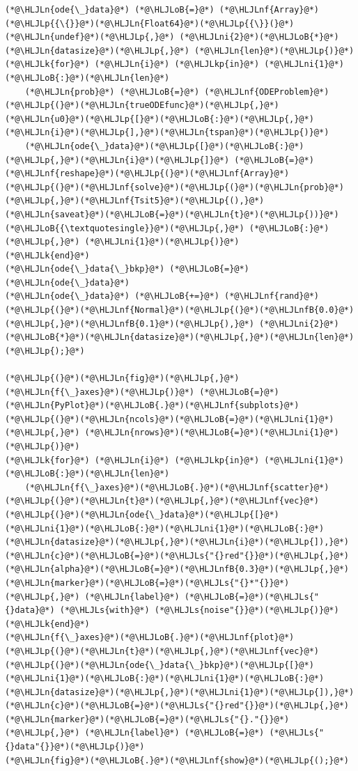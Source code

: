 \documentclass[12pt,a4paper]{article}
\newcommand{\HLJLk}[1]{\textcolor[RGB]{148,91,176}{\textbf{#1}}}
\newcommand{\HLJLkp}[1]{\textcolor[RGB]{148,91,176}{\textbf{#1}}}
\newcommand{\HLJLn}[1]{#1}
\newcommand{\HLJLnf}[1]{\textcolor[RGB]{66,102,213}{#1}}
\newcommand{\HLJLs}[1]{\textcolor[RGB]{201,61,57}{#1}}
\newcommand{\HLJLnfB}[1]{\textcolor[RGB]{59,151,46}{#1}}
\newcommand{\HLJLni}[1]{\textcolor[RGB]{59,151,46}{#1}}
\newcommand{\HLJLoB}[1]{\textcolor[RGB]{102,102,102}{\textbf{#1}}}
\newcommand{\HLJLp}[1]{#1}
\begin{document}
\begin{lstlisting}
(*@\HLJLn{ode{\_}data}@*) (*@\HLJLoB{=}@*) (*@\HLJLnf{Array}@*)(*@\HLJLp{{\{}}@*)(*@\HLJLn{Float64}@*)(*@\HLJLp{{\}}(}@*)(*@\HLJLn{undef}@*)(*@\HLJLp{,}@*) (*@\HLJLni{2}@*)(*@\HLJLoB{*}@*)(*@\HLJLn{datasize}@*)(*@\HLJLp{,}@*) (*@\HLJLn{len}@*)(*@\HLJLp{)}@*)
(*@\HLJLk{for}@*) (*@\HLJLn{i}@*) (*@\HLJLkp{in}@*) (*@\HLJLni{1}@*)(*@\HLJLoB{:}@*)(*@\HLJLn{len}@*)
	(*@\HLJLn{prob}@*) (*@\HLJLoB{=}@*) (*@\HLJLnf{ODEProblem}@*)(*@\HLJLp{(}@*)(*@\HLJLn{trueODEfunc}@*)(*@\HLJLp{,}@*)(*@\HLJLn{u0}@*)(*@\HLJLp{[}@*)(*@\HLJLoB{:}@*)(*@\HLJLp{,}@*)(*@\HLJLn{i}@*)(*@\HLJLp{],}@*)(*@\HLJLn{tspan}@*)(*@\HLJLp{)}@*)
	(*@\HLJLn{ode{\_}data}@*)(*@\HLJLp{[}@*)(*@\HLJLoB{:}@*)(*@\HLJLp{,}@*)(*@\HLJLn{i}@*)(*@\HLJLp{]}@*) (*@\HLJLoB{=}@*) (*@\HLJLnf{reshape}@*)(*@\HLJLp{(}@*)(*@\HLJLnf{Array}@*)(*@\HLJLp{(}@*)(*@\HLJLnf{solve}@*)(*@\HLJLp{(}@*)(*@\HLJLn{prob}@*)(*@\HLJLp{,}@*)(*@\HLJLnf{Tsit5}@*)(*@\HLJLp{(),}@*)(*@\HLJLn{saveat}@*)(*@\HLJLoB{=}@*)(*@\HLJLn{t}@*)(*@\HLJLp{))}@*)(*@\HLJLoB{{\textquotesingle}}@*)(*@\HLJLp{,}@*) (*@\HLJLoB{:}@*)(*@\HLJLp{,}@*) (*@\HLJLni{1}@*)(*@\HLJLp{)}@*)
(*@\HLJLk{end}@*)
(*@\HLJLn{ode{\_}data{\_}bkp}@*) (*@\HLJLoB{=}@*) (*@\HLJLn{ode{\_}data}@*)
(*@\HLJLn{ode{\_}data}@*) (*@\HLJLoB{+=}@*) (*@\HLJLnf{rand}@*)(*@\HLJLp{(}@*)(*@\HLJLnf{Normal}@*)(*@\HLJLp{(}@*)(*@\HLJLnfB{0.0}@*)(*@\HLJLp{,}@*)(*@\HLJLnfB{0.1}@*)(*@\HLJLp{),}@*) (*@\HLJLni{2}@*)(*@\HLJLoB{*}@*)(*@\HLJLn{datasize}@*)(*@\HLJLp{,}@*)(*@\HLJLn{len}@*)(*@\HLJLp{);}@*)

(*@\HLJLp{(}@*)(*@\HLJLn{fig}@*)(*@\HLJLp{,}@*) (*@\HLJLn{f{\_}axes}@*)(*@\HLJLp{)}@*) (*@\HLJLoB{=}@*) (*@\HLJLn{PyPlot}@*)(*@\HLJLoB{.}@*)(*@\HLJLnf{subplots}@*)(*@\HLJLp{(}@*)(*@\HLJLn{ncols}@*)(*@\HLJLoB{=}@*)(*@\HLJLni{1}@*)(*@\HLJLp{,}@*) (*@\HLJLn{nrows}@*)(*@\HLJLoB{=}@*)(*@\HLJLni{1}@*)(*@\HLJLp{)}@*)
(*@\HLJLk{for}@*) (*@\HLJLn{i}@*) (*@\HLJLkp{in}@*) (*@\HLJLni{1}@*)(*@\HLJLoB{:}@*)(*@\HLJLn{len}@*)
	(*@\HLJLn{f{\_}axes}@*)(*@\HLJLoB{.}@*)(*@\HLJLnf{scatter}@*)(*@\HLJLp{(}@*)(*@\HLJLn{t}@*)(*@\HLJLp{,}@*)(*@\HLJLnf{vec}@*)(*@\HLJLp{(}@*)(*@\HLJLn{ode{\_}data}@*)(*@\HLJLp{[}@*)(*@\HLJLni{1}@*)(*@\HLJLoB{:}@*)(*@\HLJLni{1}@*)(*@\HLJLoB{:}@*)(*@\HLJLn{datasize}@*)(*@\HLJLp{,}@*)(*@\HLJLn{i}@*)(*@\HLJLp{]),}@*) (*@\HLJLn{c}@*)(*@\HLJLoB{=}@*)(*@\HLJLs{"{}red"{}}@*)(*@\HLJLp{,}@*) (*@\HLJLn{alpha}@*)(*@\HLJLoB{=}@*)(*@\HLJLnfB{0.3}@*)(*@\HLJLp{,}@*) (*@\HLJLn{marker}@*)(*@\HLJLoB{=}@*)(*@\HLJLs{"{}*"{}}@*)(*@\HLJLp{,}@*) (*@\HLJLn{label}@*) (*@\HLJLoB{=}@*)(*@\HLJLs{"{}data}@*) (*@\HLJLs{with}@*) (*@\HLJLs{noise"{}}@*)(*@\HLJLp{)}@*)
(*@\HLJLk{end}@*)
(*@\HLJLn{f{\_}axes}@*)(*@\HLJLoB{.}@*)(*@\HLJLnf{plot}@*)(*@\HLJLp{(}@*)(*@\HLJLn{t}@*)(*@\HLJLp{,}@*)(*@\HLJLnf{vec}@*)(*@\HLJLp{(}@*)(*@\HLJLn{ode{\_}data{\_}bkp}@*)(*@\HLJLp{[}@*)(*@\HLJLni{1}@*)(*@\HLJLoB{:}@*)(*@\HLJLni{1}@*)(*@\HLJLoB{:}@*)(*@\HLJLn{datasize}@*)(*@\HLJLp{,}@*)(*@\HLJLni{1}@*)(*@\HLJLp{]),}@*) (*@\HLJLn{c}@*)(*@\HLJLoB{=}@*)(*@\HLJLs{"{}red"{}}@*)(*@\HLJLp{,}@*) (*@\HLJLn{marker}@*)(*@\HLJLoB{=}@*)(*@\HLJLs{"{}."{}}@*)(*@\HLJLp{,}@*) (*@\HLJLn{label}@*) (*@\HLJLoB{=}@*) (*@\HLJLs{"{}data"{}}@*)(*@\HLJLp{)}@*)
(*@\HLJLn{fig}@*)(*@\HLJLoB{.}@*)(*@\HLJLnf{show}@*)(*@\HLJLp{();}@*)
\end{lstlisting}
\end{document}
